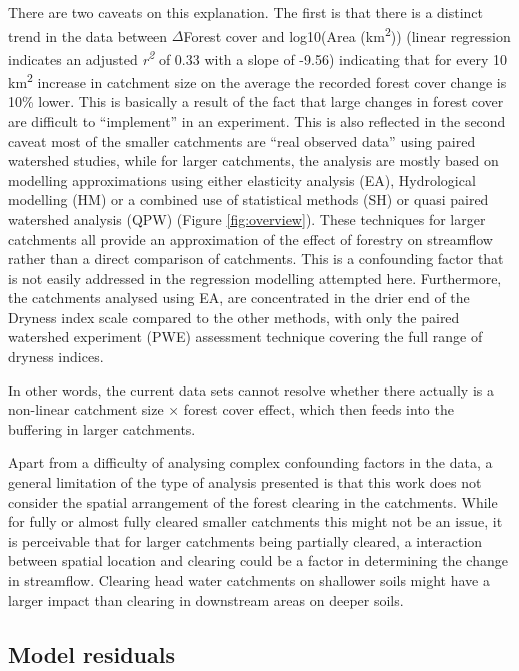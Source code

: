 \documentclass[]{elsarticle} %
\begin{document}
There are two caveats on this explanation. The first is that there is a distinct trend in the data between \(\Delta\)Forest cover and log10(Area (km\textsuperscript{2})) (linear regression indicates an adjusted \emph{r\textsuperscript{2}} of 0.33 with a slope of -9.56) indicating that for every 10 km\textsuperscript{2} increase in catchment size on the average the recorded forest cover change is 10\% lower. This is basically a result of the fact that large changes in forest cover are difficult to ``implement'' in an experiment.
This is also reflected in the second caveat most of the smaller catchments are ``real observed data'' using paired watershed studies, while for larger catchments, the analysis are mostly based on modelling approximations using either elasticity analysis (EA), Hydrological modelling (HM) or a combined use of statistical methods (SH) or quasi paired watershed analysis (QPW) (Figure \ref{fig:overview}). These techniques for larger catchments all provide an approximation of the effect of forestry on streamflow rather than a direct comparison of catchments. This is a confounding factor that is not easily addressed in the regression modelling attempted here. Furthermore, the catchments analysed using EA, are concentrated in the drier end of the Dryness index scale compared to the other methods, with only the paired watershed experiment (PWE) assessment technique covering the full range of dryness indices.

In other words, the current data sets cannot resolve whether there actually is a non-linear catchment size × forest cover effect, which then feeds into the buffering in larger catchments.

Apart from a difficulty of analysing complex confounding factors in the data, a general limitation of the type of analysis presented is that this work does not consider the spatial arrangement of the forest clearing in the catchments. While for fully or almost fully cleared smaller catchments this might not be an issue, it is perceivable that for larger catchments being partially cleared, a interaction between spatial location and clearing could be a factor in determining the change in streamflow. Clearing head water catchments on shallower soils might have a larger impact than clearing in downstream areas on deeper soils.

\hypertarget{model-residuals}{%
\subsection{Model residuals}\label{model-residuals}}
\end{document}
